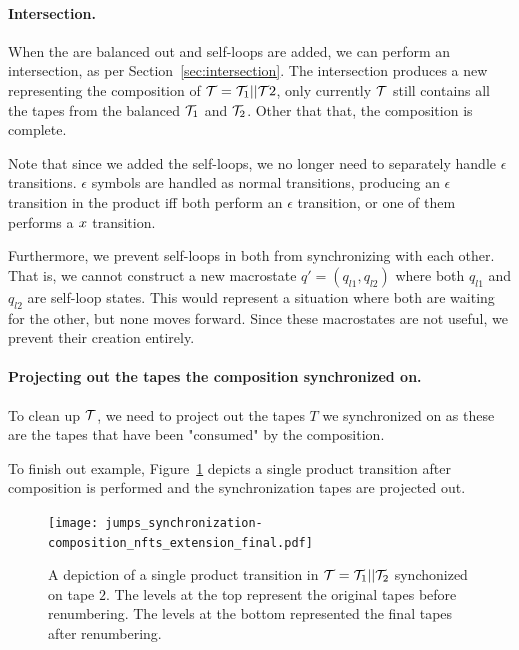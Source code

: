\paragraph{Intersection.}
When the \nfts are balanced out and self-loops are added, we can perform an \nft intersection, as per Section~\ref{sec:intersection}.
The intersection produces a new \nft representing the composition of $\mathcal{T} = \mathcal{T}_1 || \mathcal{T}2$, only currently $\mathcal{T}$ still contains all the tapes from the balanced $\mathcal{T}_1$ and $\mathcal{T}_2$.
Other that that, the composition is complete.

Note that since we added the self-loops, we no longer need to separately handle $\epsilon$ transitions.
$\epsilon$ symbols are handled as normal transitions, producing an $\epsilon$ transition in the product iff both \nfts perform an $\epsilon$ transition, or one of them performs a $x$ transition.

Furthermore, we prevent self-loops in both \nfts from synchronizing with each other.
 That is, we cannot construct a new macrostate $q' = (q_{l1}, q_{l2})$ where both $q_{l1}$ and $q_{l2}$ are self-loop states.
This would represent a situation where both \nfts are waiting for the other, but none moves forward.
Since these macrostates are not useful, we prevent their creation entirely.

\paragraph{Projecting out the tapes the composition synchronized on.}
To clean up $\mathcal{T}$, we need to project out the tapes $T$ we synchronized on as these are the tapes that have been "consumed" by the composition.

\begin{example}
  To finish out example, Figure~\ref{fig:composition_nfts_extension_final} depicts a single product transition after composition is performed and the synchronization tapes are projected out.
  \begin{figure}[ht]
    \centering
    \texttt{[image: jumps\_synchronization-composition\_nfts\_extension\_final.pdf]}
    \caption{
      A depiction of a single product transition in $\mathcal{T} = \mathcal{T}_1 || \mathcal{T}_2$ synchonized on tape $2$.
      The levels at the top represent the original tapes before renumbering.
      The levels at the bottom represented the final tapes after renumbering.
    }
    \label{fig:composition_nfts_extension_final}
  \end{figure}
\end{example}

